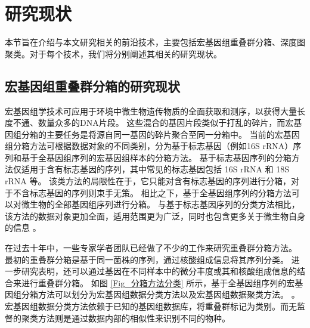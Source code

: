 \section{研究现状}
本节旨在介绍与本文研究相关的前沿技术，主要包括宏基因组重叠群分箱、深度图聚类。对于每个技术，我们将分别阐述其相关的研究现状。

\subsection{宏基因组重叠群分箱的研究现状}
宏基因组学技术可应用于环境中微生物遗传物质的全面获取和测序，以获得大量长度不通、数量众多的DNA片段。
这些混合的基因片段类似于打乱的碎片，而宏基因组分箱的主要任务是将源自同一基因的碎片聚合至同一分箱中。
当前的宏基因组分箱方法可根据数据对象的不同类别，分为基于标志基因（例如16S rRNA）序列和基于全基因组序列的宏基因组样本的分箱方法。
基于标志基因序列的分箱方法仅适用于含有标志基因的序列，其中常见的标志基因包括 16S rRNA 和 18S rRNA 等。
该类方法的局限性在于，它只能对含有标志基因的序列进行分箱，对于不含标志基因的序列则束手无策。
相比之下，基于全基因组序列的分箱方法可以对微生物的全部基因组序列进行分箱。
与基于标志基因序列的分类方法相比，该方法的数据对象更加全面，适用范围更为广泛，同时也包含更多关于微生物自身的信息 \cite{wu2016maxbin}。

在过去十年中，一些专家学者团队已经做了不少的工作来研究重叠群分箱方法。
最初的重叠群分箱是基于同一菌株的序列，通过核酸组成信息将其序列分类。
进一步研究表明，还可以通过基因在不同样本中的微分丰度或其和核酸组成信息的结合来进行重叠群分箱。
如图 \ref{Fig_分箱方法分类} 所示，基于全基因组序列的宏基因组分箱方法可以划分为宏基因组数据分类方法以及宏基因组数据聚类方法。 \cite{宏基因组重叠群分箱方法研究综述}。
宏基因组数据分类方法依赖于已知的基因组数据库，将重叠群标记为类别。而无监督的聚类方法则是通过数据内部的相似性来识别不同的物种。


